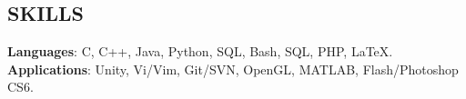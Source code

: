 \documentclass[margin]{res}
\begin{document}
\begin{resume}
%



\section{SKILLS}
\phantom{spacing}
\textbf{Languages}: C, C++, Java, Python, SQL, Bash, SQL, PHP, \LaTeX.
\\
\textbf{Applications}: Unity, Vi/Vim, Git/SVN, OpenGL, MATLAB, Flash/Photoshop CS6. 


\end{resume}
\end{document}
